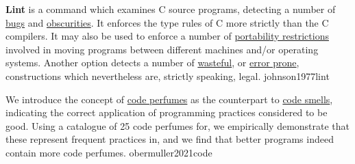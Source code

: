 \documentclass{article}
\begin{document}

  {\textbf{Lint} is a command which examines C source programs, detecting a number of \ul{bugs} and \ul{obscurities}. It enforces the type rules of C more strictly than the C compilers. It may also be used to enforce a number of \ul{portability restrictions} involved in moving programs between different machines and/or operating systems. Another option detects a number of \ul{wasteful}, or \ul{error prone}, constructions which nevertheless are, strictly speaking, legal.}
  {johnson1977lint}





  {We introduce the concept of \ul{code perfumes} as the counterpart to \ul{code smells}, indicating the correct application of programming practices considered to be good. Using a catalogue of 25 code perfumes for, we empirically demonstrate that these represent frequent practices in, and we find that better programs indeed contain more code perfumes.}
  {obermuller2021code}
\end{document}

